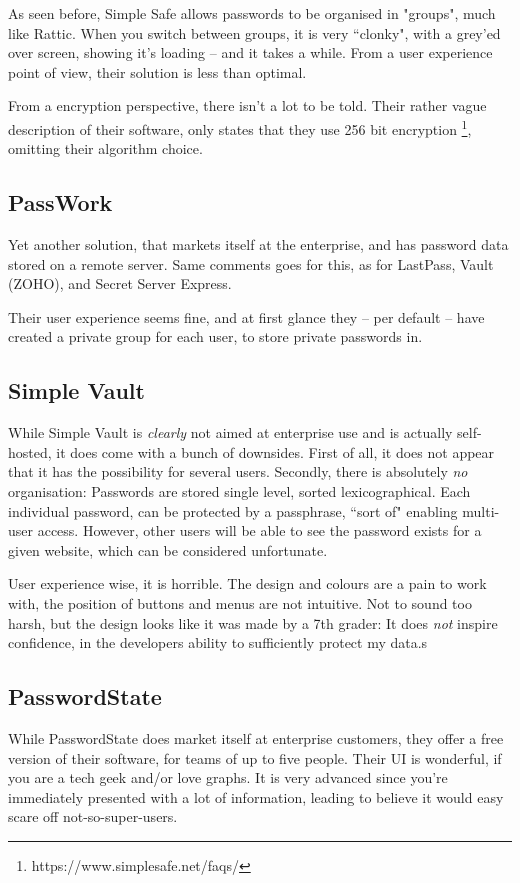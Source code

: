 			As seen before, Simple Safe allows passwords to be organised in "groups", much like Rattic. When you switch between groups, it is very ``clonky", with a grey'ed over screen, showing it's loading -- and it takes a while. From a user experience point of view, their solution is less than optimal.

			From a encryption perspective, there isn't a lot to be told. Their rather vague description of their software, only states that they use 256 bit encryption \footnote{https://www.simplesafe.net/faqs/}, omitting their algorithm choice.


		\subsection{PassWork}
			Yet another solution, that markets itself at the enterprise, and has password data stored on a remote server. Same comments goes for this, as for LastPass, Vault (ZOHO), and Secret Server Express. 

			Their user experience seems fine, and at first glance they -- per default -- have created a private group for each user, to store private passwords in. 

		\subsection{Simple Vault}
			While Simple Vault is \emph{clearly} not aimed at enterprise use and is actually self-hosted, it does come with a bunch of downsides. First of all, it does not appear that it has the possibility for several users. Secondly, there is absolutely \emph{no} organisation: Passwords are stored single level, sorted lexicographical. Each individual password, can be protected by a passphrase, ``sort of" enabling multi-user access. However, other users will be able to see the password exists for a given website, which can be considered unfortunate.

			User experience wise, it is horrible. The design and colours are a pain to work with, the position of buttons and menus are not intuitive. Not to sound too harsh, but the design looks like it was made by a 7th grader: It does \emph{not} inspire confidence, in the developers ability to sufficiently protect my data.s

		\subsection{PasswordState}
			While PasswordState does market itself at enterprise customers, they offer a free version of their software, for teams of up to five people. Their UI is wonderful, if you are a tech geek and/or love graphs. It is very advanced since you're immediately presented with a lot of information, leading to believe it would easy scare off not-so-super-users.

